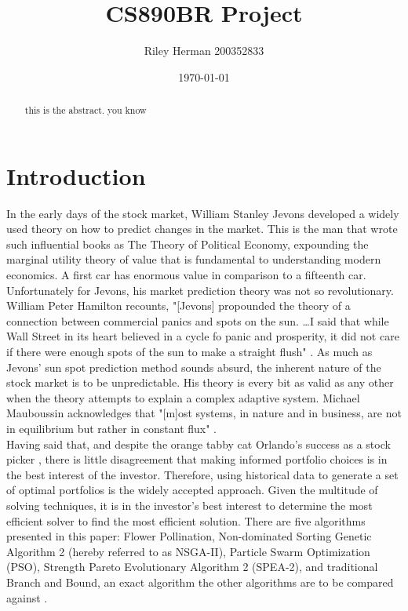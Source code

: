 \documentclass{article}
\title{CS890BR Project}
\date{\today}
\author{Riley Herman 200352833}
\begin{document}
    \maketitle
    \begin{abstract}
        this is the abstract. you know
    \end{abstract}
    \newpage
    \section{Introduction}
    In the early days of the stock market, William Stanley Jevons developed a widely used theory on how to predict changes in the market.
    This is the man that wrote such influential books as The Theory of Political Economy, expounding the marginal utility theory of value that 
    is fundamental to understanding modern economics. A first car has enormous value in comparison to a fifteenth car. Unfortunately for Jevons, 
    his market prediction theory was not so revolutionary. William Peter Hamilton recounts, "[Jevons] propounded the theory of a connection between 
    commercial panics and spots on the sun. \ldots I said that while Wall Street in its heart believed in a cycle fo panic and prosperity, 
    it did not care if there were enough spots of the sun to make a straight flush" \cite{Hamilton}. As much as Jevons' sun spot prediction method
    sounds absurd, the inherent nature of the stock market is to be unpredictable. His theory is every bit as valid as any other when the theory 
    attempts to explain a complex adaptive system. Michael Mauboussin acknowledges that "[m]ost systems, in nature and in business,
    are not in equilibrium but rather in constant flux" \cite{Mauboussin}. \\
    Having said that, and despite the orange tabby cat Orlando's success as a stock picker \cite{King}, there is little disagreement that making
    informed portfolio choices is in the best interest of the investor. Therefore, using historical data to generate a set of optimal portfolios
    is the widely accepted approach. Given the multitude of solving techniques, it is in the investor's best interest to determine the most efficient solver
    to find the most efficient solution. There are five algorithms presented in this paper: Flower Pollination, Non-dominated Sorting Genetic 
    Algorithm 2 (hereby referred to as NSGA-II), Particle Swarm Optimization (PSO), Strength Pareto Evolutionary Algorithm 2 (SPEA-2), and traditional
    Branch and Bound, an exact algorithm the other algorithms are to be compared against \cite{Yang} \cite{KaucicMoradiMirzazadeh} \cite{Guerard}. 
\end{document}
